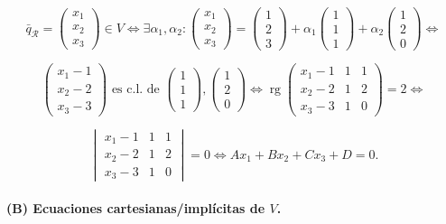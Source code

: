 \documentclass[11pt]{article}
\DeclareMathOperator{\rg}{rg}
\begin{document}
$$
\bar{q}_{\mathcal{R}}=\begin{pmatrix}x_1\\ x_2\\ x_3\end{pmatrix}\in V\iff\exists\alpha_1,\alpha_2:\begin{pmatrix}x_1\\ x_2\\ x_3\end{pmatrix}=\begin{pmatrix}1\\ 2\\ 3\end{pmatrix}+\alpha_1\begin{pmatrix}1\\ 1\\ 1\end{pmatrix}+\alpha_2\begin{pmatrix}1\\ 2\\ 0\end{pmatrix}\iff
$$

$$
\begin{pmatrix}x_1-1\\ x_2-2\\ x_3-3\end{pmatrix}\textrm{ es c.l. de }\begin{pmatrix}1\\ 1\\ 1\end{pmatrix},\begin{pmatrix}1\\ 2\\ 0\end{pmatrix}\iff\rg\begin{pmatrix}
x_1-1 & 1 & 1\\
x_2-2 & 1 & 2\\
x_3-3 & 1 & 0
\end{pmatrix}=2\iff
$$

$$
\begin{vmatrix}
x_1-1 & 1 & 1\\
x_2-2 & 1 & 2\\
x_3-3 & 1 & 0
\end{vmatrix}=0\iff Ax_1+Bx_2+Cx_3+D=0.
$$

\paragraph{(B) Ecuaciones cartesianas/implícitas de $V$.}


\newpage

\newpage
\end{document}
